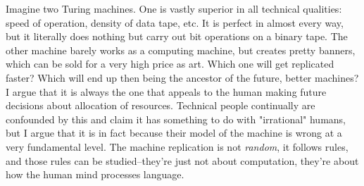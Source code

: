 \documentclass[11pt]{article}
\begin{document}
    Imagine two Turing machines.  One is vastly superior in all technical qualities: speed of operation, density of data tape, etc.  It is perfect in almost every way, but it literally does nothing but carry out bit operations on a binary tape.  The other machine barely works as a computing machine, but creates pretty banners, which can be sold for a very high price as art. Which one will get replicated faster?  Which will end up then being the ancestor of the future, better machines?  I argue that it is always the one that appeals to the human making future decisions about allocation of resources.  Technical people continually are confounded by this and claim it has something to do with "irrational" humans, but I argue that it is in fact because their model of the machine is wrong at a very fundamental level.  The machine replication is not \textit{
random}, it follows rules, and those rules can be studied--they're just not about computation, they're about how the human mind processes language.  
\end{document}
